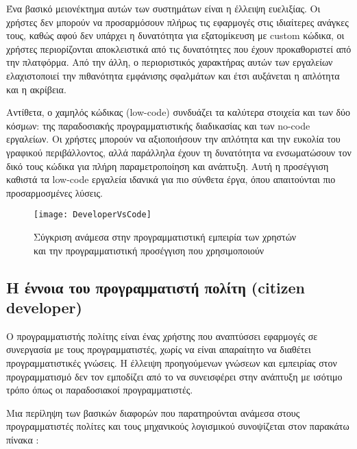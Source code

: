                 Ένα βασικό μειονέκτημα αυτών των συστημάτων είναι η έλλειψη ευελιξίας. Οι χρήστες δεν μπορούν να προσαρμόσουν πλήρως τις εφαρμογές στις ιδιαίτερες ανάγκες τους, καθώς αφού δεν υπάρχει η δυνατότητα για εξατομίκευση με custom κώδικα, οι χρήστες περιορίζονται αποκλειστικά από τις δυνατότητες που έχουν προκαθοριστεί από την πλατφόρμα. Από την άλλη, ο περιοριστικός χαρακτήρας αυτών των εργαλείων ελαχιστοποιεί την πιθανότητα εμφάνισης σφαλμάτων και έτσι αυξάνεται η απλότητα και η ακρίβεια.

                Αντίθετα, ο χαμηλός κώδικας (low-code) συνδυάζει τα καλύτερα στοιχεία και των δύο κόσμων: της παραδοσιακής προγραμματιστικής διαδικασίας και των no-code εργαλείων. Οι χρήστες μπορούν να αξιοποιήσουν την απλότητα και την ευκολία του γραφικού περιβάλλοντος, αλλά παράλληλα έχουν τη δυνατότητα να ενσωματώσουν τον δικό τους κώδικα για πλήρη παραμετροποίηση και ανάπτυξη. Αυτή η προσέγγιση καθιστά τα low-code εργαλεία ιδανικά για πιο σύνθετα έργα, όπου απαιτούνται πιο προσαρμοσμένες λύσεις. \cite{LowCodeSimon}

            \begin{figure}[h!] \noindent \centering
                    \texttt{[image: DeveloperVsCode]}
                    \caption{\centering Σύγκριση ανάμεσα στην προγραμματιστική εμπειρία των χρηστών \\ και την προγραμματιστική προσέγγιση που χρησιμοποιούν \cite{LowCodeSimon}}
            \end{figure}

            \subsection{Η έννοια του προγραμματιστή πολίτη (citizen developer)} \label{subsec:citizen-developer}
                Ο προγραμματιστής πολίτης είναι ένας χρήστης που αναπτύσσει εφαρμογές σε συνεργασία με τους προγραμματιστές, χωρίς να είναι απαραίτητο να διαθέτει προγραμματιστικές γνώσεις. Η έλλειψη προηγούμενων γνώσεων και εμπειρίας στον προγραμματισμό δεν τον εμποδίζει από το να συνεισφέρει στην ανάπτυξη με ισότιμο τρόπο όπως οι παραδοσιακοί προγραμματιστές.

                Μια περίληψη των βασικών διαφορών που παρατηρούνται ανάμεσα στους προγραμματιστές πολίτες και τους μηχανικούς λογισμικού συνοψίζεται στον παρακάτω πίνακα \cite{LowCodeSimon}:

